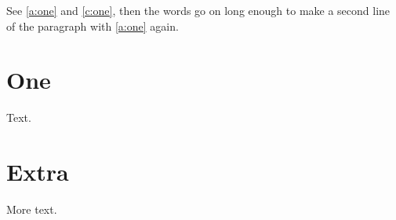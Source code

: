 \documentclass[brazil]{report}
\begin{document}
See \autoref{a:one} and \autoref{c:one}, then the words go on long enough to make a second line of the paragraph with \autoref{a:one} again.
\chapter{One}\label{c:one}
Text.
\appendix
\chapter{Extra}\label{a:one}
More text.
\end{document}

